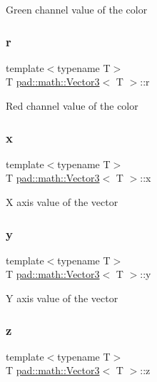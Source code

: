 Green channel value of the color \mbox{\label{structpad_1_1math_1_1_vector3_a605d25418ec0079b504fcec127e7bea4}} 
\subsubsection{\texorpdfstring{r}{r}}
{\footnotesize\ttfamily template$<$typename T$>$ \\
T \mbox{\hyperlink{structpad_1_1math_1_1_vector3}{pad\+::math\+::\+Vector3}}$<$ T $>$\+::r}

Red channel value of the color \mbox{\label{structpad_1_1math_1_1_vector3_acf0b6cc0b4fb0a077945332e816e4373}} 
\subsubsection{\texorpdfstring{x}{x}}
{\footnotesize\ttfamily template$<$typename T$>$ \\
T \mbox{\hyperlink{structpad_1_1math_1_1_vector3}{pad\+::math\+::\+Vector3}}$<$ T $>$\+::x}

X axis value of the vector \mbox{\label{structpad_1_1math_1_1_vector3_af6d815461367ca4c2f85115453470934}} 
\subsubsection{\texorpdfstring{y}{y}}
{\footnotesize\ttfamily template$<$typename T$>$ \\
T \mbox{\hyperlink{structpad_1_1math_1_1_vector3}{pad\+::math\+::\+Vector3}}$<$ T $>$\+::y}

Y axis value of the vector \mbox{\label{structpad_1_1math_1_1_vector3_adcd03301042c390430955427765261e5}} 
\subsubsection{\texorpdfstring{z}{z}}
{\footnotesize\ttfamily template$<$typename T$>$ \\
T \mbox{\hyperlink{structpad_1_1math_1_1_vector3}{pad\+::math\+::\+Vector3}}$<$ T $>$\+::z}

